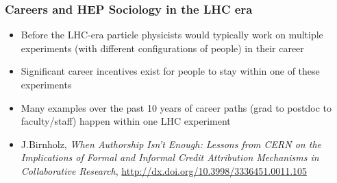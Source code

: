\begin{frame}
\frametitle{Careers and HEP Sociology in the LHC era}

\begin{itemize}
\item Before the LHC-era particle physicists would typically work on multiple experiments (with different configurations of people) in their career
\item Significant career incentives exist for people to stay within one of these experiments
\item Many examples over the past 10 years of career paths (grad to postdoc to faculty/staff) happen within one LHC experiment
\item J.Birnholz, {\it When Authorship Isn’t Enough: Lessons from CERN on the Implications of Formal and Informal Credit Attribution Mechanisms in Collaborative Research}, \url{http://dx.doi.org/10.3998/3336451.0011.105}
\end{itemize}

\end{frame}


